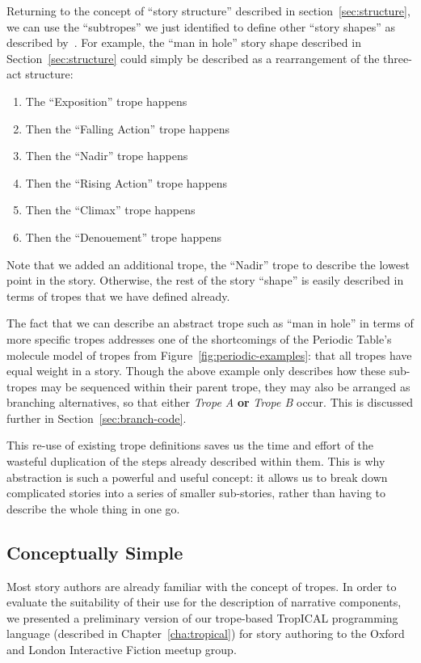 \documentclass[11pt]{report}
\begin{document}
Returning to the concept of ``story structure'' described in
section~\ref{sec:structure}, we can use the ``subtropes'' we just identified to
define other ``story shapes'' as described by~\citet{vonnegut2009palm}. For example, the ``man
in hole'' story shape described in Section~\ref{sec:structure} could simply be described as a rearrangement of the
three-act structure:

\begin{enumerate}
  \item The ``Exposition'' trope happens
  \item Then the ``Falling Action'' trope happens
  \item Then the ``Nadir'' trope happens
  \item Then the ``Rising Action'' trope happens
  \item Then the ``Climax'' trope happens
  \item Then the ``Denouement'' trope happens
\end{enumerate}

Note that we added an additional trope, the ``Nadir'' trope to describe the
lowest point in the story. Otherwise, the rest of the story ``shape'' is easily
described in terms of tropes that we have defined already.

The fact that we can describe an abstract trope such as ``man in hole'' in terms
of more specific tropes addresses one of the shortcomings of the Periodic
Table's molecule model of tropes from Figure~\ref{fig:periodic-examples}: that
all tropes have equal weight in a story. Though the above example only describes
how these sub-tropes may be sequenced within their parent trope, they may also
be arranged as branching alternatives, so that either \emph{Trope A} \textbf{or}
\emph{Trope B} occur. This is discussed further in Section~\ref{sec:branch-code}.

This re-use of existing trope definitions saves us the time and effort of the wasteful duplication of the steps
already described within them. This is why abstraction is such a powerful
and useful concept: it allows us to break down complicated stories into a series
of smaller sub-stories, rather than having to describe the whole thing in one go.

\subsection{Conceptually Simple}\label{sec:tropes-simple}

Most story authors are already familiar with the concept of tropes. In order to
evaluate the suitability of their use for the description of narrative
components, we presented a preliminary version of our trope-based TropICAL programming
language (described in Chapter~\ref{cha:tropical}) for story authoring to the Oxford and London Interactive Fiction meetup group.
\end{document}
